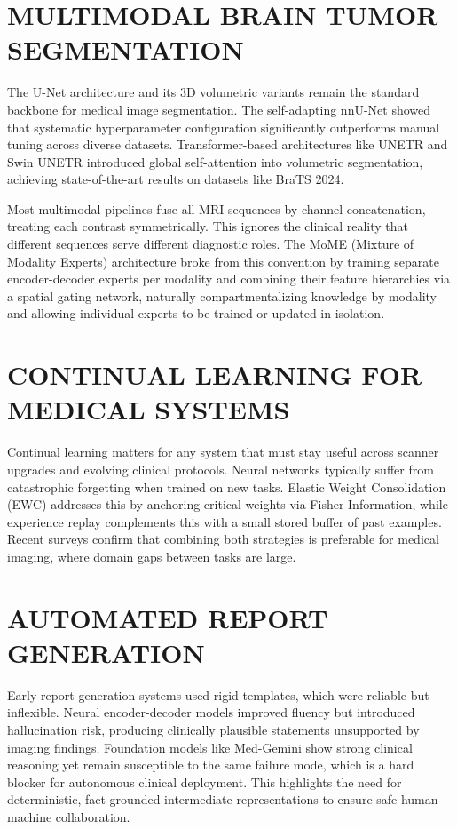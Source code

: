 \documentclass[12pt, a4paper]{report}
\begin{document}
\section{MULTIMODAL BRAIN TUMOR SEGMENTATION}
The U-Net architecture and its 3D volumetric variants remain the standard backbone for medical image segmentation. The self-adapting nnU-Net showed that systematic hyperparameter configuration significantly outperforms manual tuning across diverse datasets. Transformer-based architectures like UNETR and Swin UNETR introduced global self-attention into volumetric segmentation, achieving state-of-the-art results on datasets like BraTS 2024.

Most multimodal pipelines fuse all MRI sequences by channel-concatenation, treating each contrast symmetrically. This ignores the clinical reality that different sequences serve different diagnostic roles. The MoME (Mixture of Modality Experts) architecture broke from this convention by training separate encoder-decoder experts per modality and combining their feature hierarchies via a spatial gating network, naturally compartmentalizing knowledge by modality and allowing individual experts to be trained or updated in isolation.

\section{CONTINUAL LEARNING FOR MEDICAL SYSTEMS}
Continual learning matters for any system that must stay useful across scanner upgrades and evolving clinical protocols. Neural networks typically suffer from catastrophic forgetting when trained on new tasks. Elastic Weight Consolidation (EWC) addresses this by anchoring critical weights via Fisher Information, while experience replay complements this with a small stored buffer of past examples. Recent surveys confirm that combining both strategies is preferable for medical imaging, where domain gaps between tasks are large.

\section{AUTOMATED REPORT GENERATION}
Early report generation systems used rigid templates, which were reliable but inflexible. Neural encoder-decoder models improved fluency but introduced hallucination risk, producing clinically plausible statements unsupported by imaging findings. Foundation models like Med-Gemini show strong clinical reasoning yet remain susceptible to the same failure mode, which is a hard blocker for autonomous clinical deployment. This highlights the need for deterministic, fact-grounded intermediate representations to ensure safe human-machine collaboration.
\end{document}
